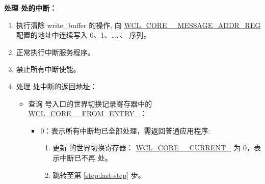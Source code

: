 \documentclass[main\_\_CN.tex]{subfiles}
\begin{document}
\textbf{处理  处的中断：\label{step:wctrl-start-interrput}}
    \begin{enumerate}
        \item 执行清除 write\_buffer 的操作, 向 \hyperref[regdesc:WCLCORE0MESSAGEADDRREG]{WCL\_CORE\_\_MESSAGE\_ADDR\_REG} 配置的地址中连续写入 0、1、\dots 、、 序列。
        \item 正常执行中断服务程序。\label{step:interrupt-process-normal}
        \item 禁止所有中断使能。
        \item 处理  处中断的返回地址： \label{step:interrupt_process_update}
        \begin{itemize}
            \item 查询  号入口的世界切换记录寄存器中的 \hyperref[fielddesc:WCLCORE0FROMENTRYn]{WCL\_CORE\_\_FROM\_ENTRY\_}：
            \begin{itemize}
                \item 0：表示所有中断均已全部处理，需返回普通应用程序:
                \begin{enumerate}
                    \item 更新  的世界切换寄存器： \hyperref[fielddesc:WCLCORE0CURRENTn]{WCL\_CORE\_\_CURRENT\_} 为 0，表示中断已不再  处。
                    \item 跳转至第 \ref{step:last-step} 步。
                \end{enumerate}


\end{itemize}
\end{itemize}
\end{enumerate}
\end{document}
